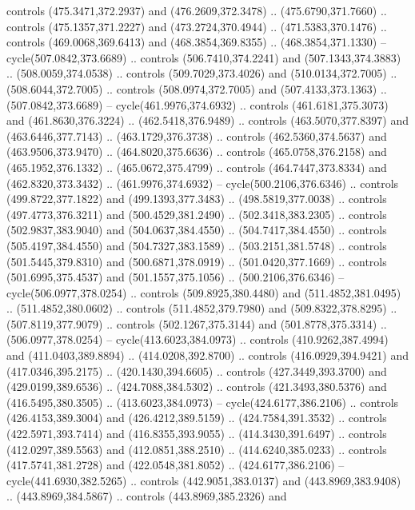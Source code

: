 \begin{scope}[cm={{1.25,0.0,0.0,-1.25,(0.0,743.43331)}}]
    controls (475.3471,372.2937) and (476.2609,372.3478) .. (475.6790,371.7660) ..
    controls (475.1357,371.2227) and (473.2724,370.4944) .. (471.5383,370.1476) ..
    controls (469.0068,369.6413) and (468.3854,369.8355) .. (468.3854,371.1330) --
    cycle(507.0842,373.6689) .. controls (506.7410,374.2241) and
    (507.1343,374.3883) .. (508.0059,374.0538) .. controls (509.7029,373.4026) and
    (510.0134,372.7005) .. (508.6044,372.7005) .. controls (508.0974,372.7005) and
    (507.4133,373.1363) .. (507.0842,373.6689) -- cycle(461.9976,374.6932) ..
    controls (461.6181,375.3073) and (461.8630,376.3224) .. (462.5418,376.9489) ..
    controls (463.5070,377.8397) and (463.6446,377.7143) .. (463.1729,376.3738) ..
    controls (462.5360,374.5637) and (463.9506,373.9470) .. (464.8020,375.6636) ..
    controls (465.0758,376.2158) and (465.1952,376.1332) .. (465.0672,375.4799) ..
    controls (464.7447,373.8334) and (462.8320,373.3432) .. (461.9976,374.6932) --
    cycle(500.2106,376.6346) .. controls (499.8722,377.1822) and
    (499.1393,377.3483) .. (498.5819,377.0038) .. controls (497.4773,376.3211) and
    (500.4529,381.2490) .. (502.3418,383.2305) .. controls (502.9837,383.9040) and
    (504.0637,384.4550) .. (504.7417,384.4550) .. controls (505.4197,384.4550) and
    (504.7327,383.1589) .. (503.2151,381.5748) .. controls (501.5445,379.8310) and
    (500.6871,378.0919) .. (501.0420,377.1669) .. controls (501.6995,375.4537) and
    (501.1557,375.1056) .. (500.2106,376.6346) -- cycle(506.0977,378.0254) ..
    controls (509.8925,380.4480) and (511.4852,381.0495) .. (511.4852,380.0602) ..
    controls (511.4852,379.7980) and (509.8322,378.8295) .. (507.8119,377.9079) ..
    controls (502.1267,375.3144) and (501.8778,375.3314) .. (506.0977,378.0254) --
    cycle(413.6023,384.0973) .. controls (410.9262,387.4994) and
    (411.0403,389.8894) .. (414.0208,392.8700) .. controls (416.0929,394.9421) and
    (417.0346,395.2175) .. (420.1430,394.6605) .. controls (427.3449,393.3700) and
    (429.0199,389.6536) .. (424.7088,384.5302) .. controls (421.3493,380.5376) and
    (416.5495,380.3505) .. (413.6023,384.0973) -- cycle(424.6177,386.2106) ..
    controls (426.4153,389.3004) and (426.4212,389.5159) .. (424.7584,391.3532) ..
    controls (422.5971,393.7414) and (416.8355,393.9055) .. (414.3430,391.6497) ..
    controls (412.0297,389.5563) and (412.0851,388.2510) .. (414.6240,385.0233) ..
    controls (417.5741,381.2728) and (422.0548,381.8052) .. (424.6177,386.2106) --
    cycle(441.6930,382.5265) .. controls (442.9051,383.0137) and
    (443.8969,383.9408) .. (443.8969,384.5867) .. controls (443.8969,385.2326) and

\end{scope}
